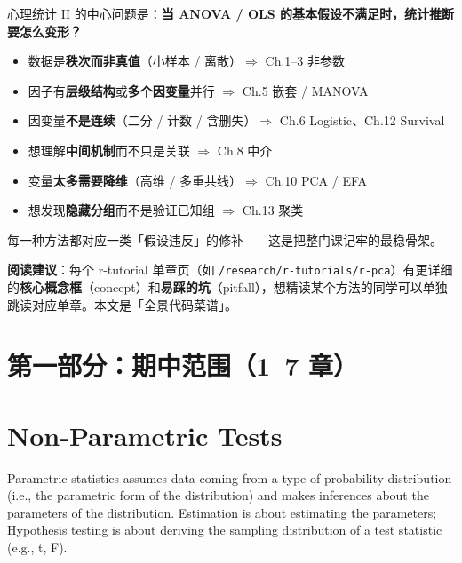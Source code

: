 \documentclass[
]{ctexart}
\begin{document}
\begin{concept}[这门课的核心脉络]
心理统计 II 的中心问题是：\textbf{当 ANOVA / OLS 的基本假设不满足时，统计推断要怎么变形？}

\begin{itemize}
\item 数据是\textbf{秩次而非真值}（小样本 / 离散）$\Rightarrow$ Ch.1--3 非参数
\item 因子有\textbf{层级结构}或\textbf{多个因变量}并行 $\Rightarrow$ Ch.5 嵌套 / MANOVA
\item 因变量\textbf{不是连续}（二分 / 计数 / 含删失）$\Rightarrow$ Ch.6 Logistic、Ch.12 Survival
\item 想理解\textbf{中间机制}而不只是关联 $\Rightarrow$ Ch.8 中介
\item 变量\textbf{太多需要降维}（高维 / 多重共线）$\Rightarrow$ Ch.10 PCA / EFA
\item 想发现\textbf{隐藏分组}而不是验证已知组 $\Rightarrow$ Ch.13 聚类
\end{itemize}

每一种方法都对应一类「假设违反」的修补——这是把整门课记牢的最稳骨架。
\end{concept}

\textbf{阅读建议}：每个 r-tutorial 单章页（如
\texttt{/research/r-tutorials/r-pca}）有更详细的\textbf{核心概念框}（concept）和\textbf{易踩的坑}（pitfall），想精读某个方法的同学可以单独跳读对应单章。本文是「全景代码菜谱」。

\newpage

\hypertarget{ux7b2cux4e00ux90e8ux5206ux671fux4e2dux8303ux56f417-ux7ae0}{%
\section{第一部分：期中范围（1--7
章）}\label{ux7b2cux4e00ux90e8ux5206ux671fux4e2dux8303ux56f417-ux7ae0}}

\hypertarget{non-parametric-tests}{%
\section{Non-Parametric Tests}\label{non-parametric-tests}}

Parametric statistics assumes data coming from a type of probability
distribution (i.e., the parametric form of the distribution) and makes
inferences about the parameters of the distribution. Estimation is about
estimating the parameters; Hypothesis testing is about deriving the
sampling distribution of a test statistic (e.g., t, F).
\end{document}
